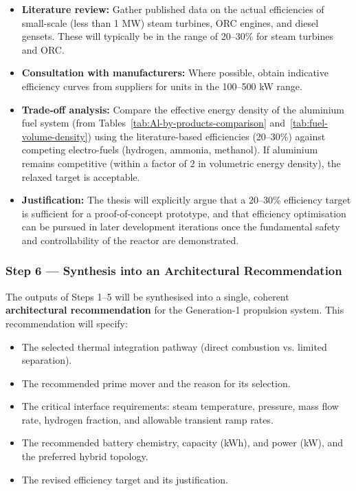 \documentclass[12pt]{article}
\begin{document}
\begin{itemize}
    \item \textbf{Literature review:} Gather published data on the actual efficiencies of small-scale (less than 1 MW) steam turbines, ORC engines, and diesel gensets. These will typically be in the range of 20–30\% for steam turbines and ORC.
    \item \textbf{Consultation with manufacturers:} Where possible, obtain indicative efficiency curves from suppliers for units in the 100–500 kW range.
    \item \textbf{Trade-off analysis:} Compare the effective energy density of the aluminium fuel system (from Tables~\ref{tab:Al-by-products-comparison} and~\ref{tab:fuel-volume-density}) using the literature-based efficiencies (20–30\%) against competing electro-fuels (hydrogen, ammonia, methanol). If aluminium remains competitive (within a factor of 2 in volumetric energy density), the relaxed target is acceptable.
    \item \textbf{Justification:} The thesis will explicitly argue that a 20–30\% efficiency target is sufficient for a proof-of-concept prototype, and that efficiency optimisation can be pursued in later development iterations once the fundamental safety and controllability of the reactor are demonstrated.
\end{itemize}

\subsubsection*{Step 6 — Synthesis into an Architectural Recommendation}

The outputs of Steps 1–5 will be synthesised into a single, coherent \textbf{architectural recommendation} for the Generation-1 propulsion system. This recommendation will specify:

\begin{itemize}
    \item The selected thermal integration pathway (direct combustion vs. limited separation).
    \item The recommended prime mover and the reason for its selection.
    \item The critical interface requirements: steam temperature, pressure, mass flow rate, hydrogen fraction, and allowable transient ramp rates.
    \item The recommended battery chemistry, capacity (kWh), and power (kW), and the preferred hybrid topology.
    \item The revised efficiency target and its justification.
\end{itemize}
\end{document}
